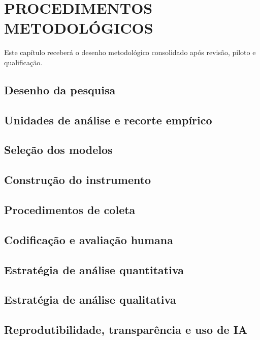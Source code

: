 \chapter{PROCEDIMENTOS METODOLÓGICOS}

Este capítulo receberá o desenho metodológico consolidado após revisão, piloto e qualificação.

\section{Desenho da pesquisa}

\section{Unidades de análise e recorte empírico}

\section{Seleção dos modelos}

\section{Construção do instrumento}

\section{Procedimentos de coleta}

\section{Codificação e avaliação humana}

\section{Estratégia de análise quantitativa}

\section{Estratégia de análise qualitativa}

\section{Reprodutibilidade, transparência e uso de IA}
